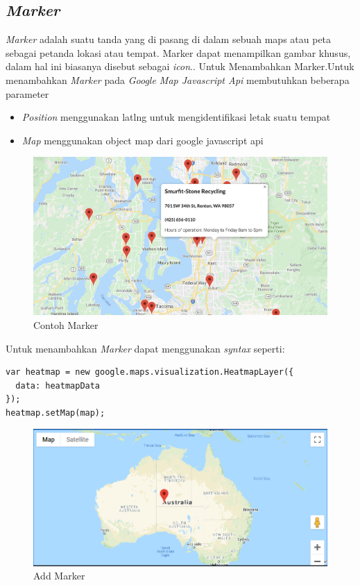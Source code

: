  \subsection{\textit{Marker}}
 \label{subsec:heat map}
 \textit{Marker } adalah suatu tanda yang di pasang di dalam sebuah maps atau peta sebagai petanda lokasi atau tempat. Marker  dapat menampilkan gambar khusus, dalam hal ini biasanya disebut sebagai \textit{icon}.\cite{GoogleMarker:01:Maps}.
 Untuk Menambahkan Marker.Untuk menambahkan \textit{Marker} pada \textit{Google Map Javascript Api} membutuhkan beberapa parameter
  \begin{itemize}
     \item \textit{Position}  menggunakan latlng untuk mengidentifikasi letak suatu tempat
     \item \textit{Map} menggunakan object map dari google javascript api
 \end{itemize}
 \begin{figure}[H]
    \centering
    \includegraphics[scale=0.2]{Gambar/marker_example.png}
    \caption{Contoh Marker}
    \label{fig:my_label}
\end{figure}

Untuk menambahkan \textit{Marker} dapat menggunakan \textit{syntax} seperti:
\begin{lstlisting}
var heatmap = new google.maps.visualization.HeatmapLayer({
  data: heatmapData
});
heatmap.setMap(map);

\end{lstlisting}
  \begin{figure}[H]
    \centering
    \includegraphics[scale=0.5]{Gambar/add_marker.PNG}
    \caption{Add Marker}
    \label{fig:my_label}
\end{figure}




